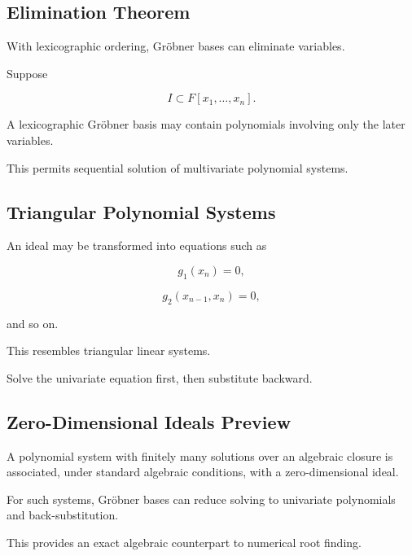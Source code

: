 \subsection{Elimination Theorem}
\label{subsec:groebner-elimination-theorem}

With lexicographic ordering, Gröbner bases can eliminate variables.

Suppose

\[
I
\subset
F[x_1,\ldots,x_n].
\]

A lexicographic Gröbner basis may contain polynomials involving only the
later variables.

This permits sequential solution of multivariate polynomial systems.

\subsection{Triangular Polynomial Systems}
\label{subsec:triangular-polynomial-systems}

An ideal may be transformed into equations such as

\[
\boxed{
g_1(x_n)=0,
}
\]

\[
\boxed{
g_2(x_{n-1},x_n)=0,
}
\]

and so on.

This resembles triangular linear systems.

Solve the univariate equation first, then substitute backward.

\subsection{Zero-Dimensional Ideals Preview}
\label{subsec:zero-dimensional-ideals-preview}

A polynomial system with finitely many solutions over an algebraic closure
is associated, under standard algebraic conditions, with a zero-dimensional
ideal.

For such systems, Gröbner bases can reduce solving to univariate
polynomials and back-substitution.

This provides an exact algebraic counterpart to numerical root finding.

